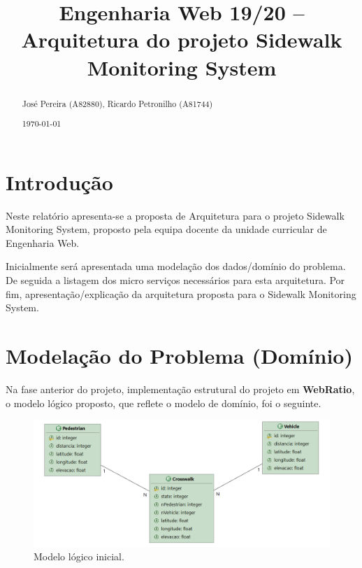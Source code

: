 \documentclass[acmsmall,nonacm,screen]{acmart}
\begin{document}
\title{Engenharia Web 19/20 -- Arquitetura do projeto Sidewalk Monitoring System}
\makeatletter \renewcommand{\shortauthors}{\@title} \makeatother

\begin{abstract}
\large
\vspace*{-.8\baselineskip}
José Pereira (A82880), Ricardo Petronilho (A81744)
\vspace*{.4\baselineskip}
\par \noindent \today
\vspace*{.25\baselineskip}
\end{abstract}

\maketitle


\section{Introdução}
\hspace{5mm} Neste relatório apresenta-se a proposta de Arquitetura para o projeto Sidewalk Monitoring System, proposto pela equipa docente da unidade curricular de Engenharia Web.

\hspace{5mm} Inicialmente será apresentada uma modelação dos dados/domínio do problema. De seguida a listagem dos micro serviços necessários para esta arquitetura. Por fim, apresentação/explicação da arquitetura proposta para o Sidewalk Monitoring System.

\section{Modelação do Problema (Domínio)}

\hspace{5mm} Na fase anterior do projeto, implementação estrutural do projeto em \textbf{WebRatio}, o modelo lógico proposto, que reflete o modelo de domínio, foi o seguinte.

\begin{figure}[H]
    \centering
    \includegraphics[scale=0.5]{images/modelo-logico-inicial.png}
    \caption{Modelo lógico inicial.}
    \label{img:modelo-logico}
\end{figure}
\end{document}
